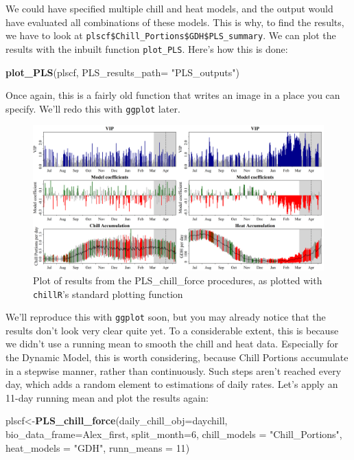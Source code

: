 \documentclass[
]{book}
\newenvironment{Shaded}{\begin{snugshade}}{\end{snugshade}}
\newcommand{\DataTypeTok}[1]{\textcolor[rgb]{0.13,0.29,0.53}{#1}}
\newcommand{\DecValTok}[1]{\textcolor[rgb]{0.00,0.00,0.81}{#1}}
\newcommand{\KeywordTok}[1]{\textcolor[rgb]{0.13,0.29,0.53}{\textbf{#1}}}
\newcommand{\NormalTok}[1]{#1}
\newcommand{\StringTok}[1]{\textcolor[rgb]{0.31,0.60,0.02}{#1}}
\begin{document}
We could have specified multiple chill and heat models, and the output would have evaluated all combinations of these models. This is why, to find the results, we have to look at \texttt{plscf\$Chill\_Portions\$GDH\$PLS\_summary}. We can plot the results with the inbuilt function \texttt{plot\_PLS}. Here's how this is done:

\begin{Shaded}
\begin{Highlighting}[]
\KeywordTok{plot_PLS}\NormalTok{(plscf, }\DataTypeTok{PLS_results_path=} \StringTok{"PLS_outputs"}\NormalTok{)}
\end{Highlighting}
\end{Shaded}

Once again, this is a fairly old function that writes an image in a place you can specify. We'll redo this with \texttt{ggplot} later.

\begin{figure}
\centering
\includegraphics{pictures/plscf_Chill_Portions_GDH.png}
\caption{Plot of results from the PLS\_chill\_force procedures, as plotted with \texttt{chillR}'s standard plotting function}
\end{figure}

We'll reproduce this with \texttt{ggplot} soon, but you may already notice that the results don't look very clear quite yet. To a considerable extent, this is because we didn't use a running mean to smooth the chill and heat data. Especially for the Dynamic Model, this is worth considering, because Chill Portions accumulate in a stepwise manner, rather than continuously. Such steps aren't reached every day, which adds a random element to estimations of daily rates. Let's apply an 11-day running mean and plot the results again:

\begin{Shaded}
\begin{Highlighting}[]
\NormalTok{plscf<-}\KeywordTok{PLS_chill_force}\NormalTok{(}\DataTypeTok{daily_chill_obj=}\NormalTok{daychill,}
                       \DataTypeTok{bio_data_frame=}\NormalTok{Alex_first,}
                       \DataTypeTok{split_month=}\DecValTok{6}\NormalTok{,}
                       \DataTypeTok{chill_models =} \StringTok{"Chill_Portions"}\NormalTok{,}
                       \DataTypeTok{heat_models =} \StringTok{"GDH"}\NormalTok{,}
                       \DataTypeTok{runn_means =} \DecValTok{11}\NormalTok{)}
\end{Highlighting}
\end{Shaded}
\end{document}
